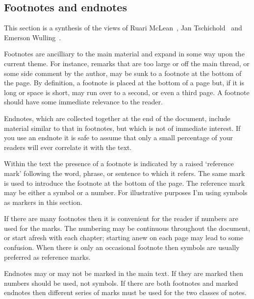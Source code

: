 \documentclass[10pt,a4paper,extrafontsizes]{memoir}
\begin{document}
\subsection{Footnotes and endnotes}

\renewcommand*{\thefootnote}{\fnsymbol{footnote}}
\let\oldfootnoterule\footnoterule
\renewcommand*{\footnoterule}{}

\begin{paracol}{2}
\switchEng
    This section is a synthesis of the views of Ruari McLean~\autocite{MCLEAN80},
Jan Tschichold~\autocite{TSCHICHOLD91} and 
Emerson Wulling~\autocite{WULLING-FOOTNOTES}.

    Footnotes are ancilliary to the main material and 
expand in some way
upon the current theme. For instance, remarks that are too large or off the
main thread, or some side comment by the author, may be sunk to a footnote 
at the bottom of the page. By definition, a footnote is placed at the 
bottom of a page but, if it is long or space is short, may run over to a 
second, or even a third page. A footnote should have some immediate 
relevance to the reader.

Endnotes, which are collected together at the end of the 
document, include 
material similar to that in footnotes, but which is not of immediate interest.
If you use an endnote it is safe to assume that only a small 
percentage of your readers will ever correlate it with the text.
 
    Within the text the presence of a footnote is indicated by a raised 
`reference mark' following the
word, phrase, or sentence to which it refers. The same mark is used 
to introduce the footnote at the bottom of the page.
The reference mark may be either a 
symbol or a number. For illustrative purposes I'm using symbols
as markers in this section.

   If there are many footnotes then it is convenient for the reader if numbers 
are used for the marks. The numbering may be continuous 
throughout the document,
or start afresh with each chapter; starting anew on each page may lead to
some confusion. When there is only an occasional footnote then symbols 
are usually preferred as reference marks.

    Endnotes may or may not be marked in the main text. 
If they are marked then numbers
should be used, not symbols. If there are both footnotes and marked endnotes 
then different series of marks must be used for the two classes of notes.


\end{paracol}
\end{document}
